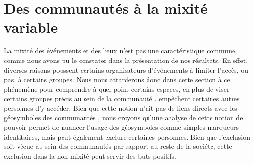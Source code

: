 \section{Des communautés à la mixité variable}
La mixité des événements et des lieux \lgbt{} n'est pas une caractéristique commune, comme nous avons pu le constater dans la présentation de nos résultats.
En effet, diverses raisons poussent certains organisateurs d'événements à limiter l'accès, ou pas, à certains groupes.
Nous nous attarderons donc dans cette section à ce phénomène pour comprendre à quel point certains espaces, en plus de viser certains groupes précis au sein de la communauté \lgbt{}, empêchent certaines autres personnes d'y accéder.
Bien que cette notion n'ait pas de liens directs avec les géosymboles des communautés \lgbt{}, nous croyons qu'une analyse de cette notion de pouvoir permet de nuancer l'usage des géosymboles comme simples marqueurs identitaires, mais peut également exclure certaines personnes.
Bien que l'exclusion soit vécue au sein des communautés \lgbt{} par rapport au reste de la société, cette exclusion dans la non-mixité peut servir des buts positifs.

